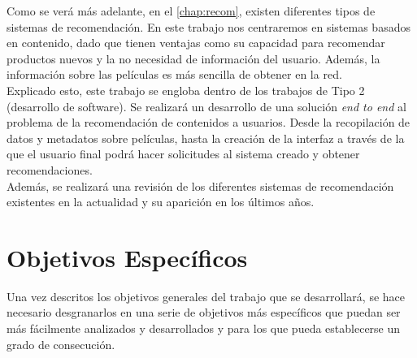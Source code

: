 Como se verá más adelante, en el \autoref{chap:recom}, existen diferentes tipos de sistemas de recomendación. En este trabajo nos centraremos en sistemas basados en contenido, dado que tienen ventajas como su capacidad para recomendar productos nuevos y la no necesidad de información del usuario. Además, la información sobre las películas es más sencilla de obtener en la red.\\

Explicado esto, este trabajo se engloba dentro de los trabajos de Tipo 2 (desarrollo de software). Se realizará un desarrollo de una solución \textit{end to end} al problema de la recomendación de contenidos a usuarios. Desde la recopilación de datos y metadatos sobre películas, hasta la creación de la interfaz a través de la que el usuario final podrá hacer solicitudes al sistema creado y obtener recomendaciones.\\

Además, se realizará una revisión de los diferentes sistemas de recomendación existentes en la actualidad y su aparición en los últimos años.\\



\section{Objetivos Específicos}\label{sec:objespecificos}

Una vez descritos los objetivos generales del trabajo que se desarrollará, se hace necesario desgranarlos en una serie de objetivos más específicos que puedan ser más fácilmente analizados y desarrollados y para los que pueda establecerse un grado de consecución.


